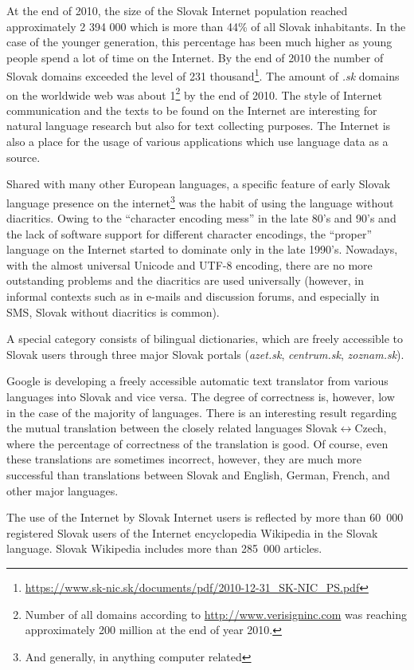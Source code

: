 At the end of 2010, the size of the Slovak Internet population reached approximately 2 394 000 which is more than 44\% of all Slovak inhabitants. In the case of the younger generation, this percentage has been much higher as young people spend a lot of time on the Internet. By the end of 2010 the number of Slovak domains exceeded the level of 231 thousand\footnote{\url{https://www.sk-nic.sk/documents/pdf/2010-12-31_SK-NIC_PS.pdf}}. The amount of \emph{.sk} domains on the worldwide web was about 1\textperthousand\footnote{Number of all domains according to \url{http://www.verisigninc.com} was reaching approximately 200 million at the end of year 2010.} by the end of 2010. The style of Internet communication and the texts to be found on the Internet are interesting for natural language research but also for text collecting purposes. The  Internet is also a place for the usage of various applications which use language data as a source.  

Shared with many other European languages, a specific feature of early Slovak language presence on the internet\footnote{And generally, in anything computer related} was the habit of using the language without diacritics. Owing to the “character encoding mess” in the late 80's and 90's and the lack of software support for different character encodings, the “proper” language on the Internet started to dominate only in the late 1990's. Nowadays, with the almost universal Unicode and UTF-8 encoding, there are no more outstanding problems and the diacritics are used universally (however, in informal contexts such as in e-mails and discussion forums, and especially in SMS, Slovak without diacritics is common). 

A special category consists of bilingual dictionaries, which are freely accessible to Slovak users through three major Slovak portals (\emph{azet.sk}, \emph{centrum.sk}, \emph{zoznam.sk}). 

Google is developing a freely accessible automatic text translator from various languages into Slovak and vice versa. The degree of correctness is, however, low in the case of the majority of languages. There is an interesting result regarding the mutual translation between the closely related languages Slovak$\leftrightarrow$Czech, where the percentage of correctness of the translation is good. Of course, even these translations are sometimes incorrect, however, they are much more successful than translations between Slovak and English, German, French, and other major languages.  

The use of the Internet by Slovak Internet users is reflected by more than 60~000 registered Slovak users of the Internet encyclopedia Wikipedia in the Slovak language. Slovak Wikipedia includes more than 285~000 articles. 
